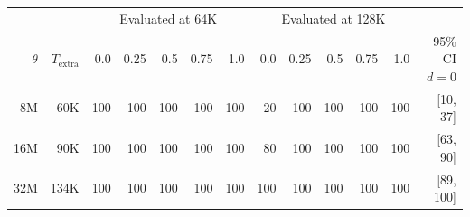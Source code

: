 \begin{tabular}{rrrrrrrrrrrrr}
\toprule
 & & \multicolumn{5}{c}{Evaluated at 64K} & \multicolumn{5}{c}{Evaluated at 128K} & \\
\cmidrule(lr){3-7}\cmidrule(lr){8-12}
$\theta$ & $T_{\mathrm{extra}}$ & 0.0 & 0.25 & 0.5 & 0.75 & 1.0 & 0.0 & 0.25 & 0.5 & 0.75 & 1.0 & 95\% CI $d=0$ \\
\midrule
8M & 60K & 100 & 100 & 100 & 100 & 100 & 20 & 100 & 100 & 100 & 100 & [10, 37] \\
16M & 90K & 100 & 100 & 100 & 100 & 100 & 80 & 100 & 100 & 100 & 100 & [63, 90] \\
32M & 134K & 100 & 100 & 100 & 100 & 100 & 100 & 100 & 100 & 100 & 100 & [89, 100] \\
\bottomrule
\end{tabular}
